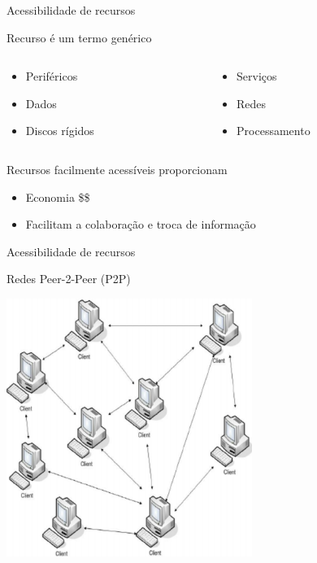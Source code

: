 \documentclass[compress]{beamer}
\begin{document}

\begin{frame}{Acessibilidade de recursos}

Recurso é um termo genérico
\begin{columns}[T]
    \begin{column}{.3\textwidth}
        \begin{itemize}
            \item Periféricos
            \item Dados
            \item Discos rígidos
        \end{itemize}
    \end{column}
    \begin{column}{.48\textwidth}
        \begin{itemize}
            \item Serviços
            \item Redes
            \item Processamento
        \end{itemize}
    \end{column}
\end{columns}

\vspace{1cm}

Recursos facilmente acessíveis proporcionam
\begin{itemize}
    \item Economia \$\$
    \item Facilitam a colaboração e troca de informação
\end{itemize}
\end{frame}


\begin{frame}{Acessibilidade de recursos}

Redes Peer-2-Peer (P2P)

\vspace{0.5cm}

\centering \includegraphics[width=0.6\textwidth]{images/p2p.png}
\end{frame}
\end{document}
